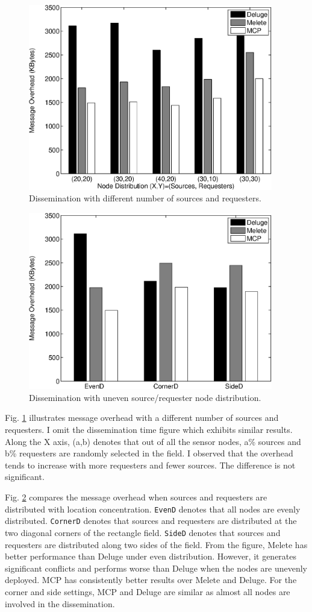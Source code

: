 \begin{figure}[htbp]
\centering
\includegraphics[width=4.2in]{figures/fdist1.eps}
\caption{Dissemination with different number of sources and requesters.}
\label{fsr}
\end{figure}

\begin{figure}[htbp]
\centering
\includegraphics[width=4.2in]{figures/fdist3.eps}
\caption{Dissemination with uneven source/requester node distribution.}
\label{floc}
\end{figure}

Fig. \ref{fsr} illustrates message overhead with a different number of sources and requesters. I omit the dissemination 
time figure which exhibits similar results.
Along the X axis, (a,b) denotes that out of all the sensor nodes, a\% sources and b\% requesters are randomly selected 
in the field. I observed that the overhead tends to increase with more requesters and fewer sources. The difference is 
not significant.


Fig. \ref{floc} compares the message overhead when sources and requesters are distributed with location concentration. 
{\tt EvenD} denotes that all nodes are evenly distributed. {\tt CornerD} denotes that sources and requesters are 
distributed at the two diagonal corners of the rectangle field. {\tt SideD} denotes that sources and requesters are 
distributed along two sides of the field. From the figure, Melete has better performance than Deluge under even 
distribution. However, it generates significant conflicts and performs worse than Deluge when the nodes are unevenly 
deployed. MCP has consistently better results over Melete and Deluge. For the corner and side settings, MCP and Deluge 
are similar as almost all nodes are involved in the dissemination. 


